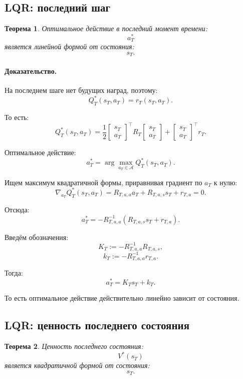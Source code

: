 \documentclass[12pt,a4paper]{article}
\newtheorem{theorem}{Теорема}
\begin{document}
\subsection{LQR: последний шаг}

\begin{theorem}
Оптимальное действие в последний момент времени:
\[
a_T^\ast
\]
является линейной формой от состояния:
\[
s_T.
\]
\end{theorem}

\paragraph{Доказательство.}

На последнем шаге нет будущих наград, поэтому:
\[
Q_T^\ast(s_T,a_T)
=
r_T(s_T,a_T).
\]

То есть:
\[
Q_T^\ast(s_T,a_T)
=
\frac{1}{2}
\begin{bmatrix}
s_T\\
a_T
\end{bmatrix}^{\top}
R_T
\begin{bmatrix}
s_T\\
a_T
\end{bmatrix}
+
\begin{bmatrix}
s_T\\
a_T
\end{bmatrix}^{\top}
r_T.
\]

Оптимальное действие:
\[
a_T^\ast
=
\arg\max_{a_T\in\mathcal A}
Q_T^\ast(s_T,a_T).
\]

Ищем максимум квадратичной формы, приравнивая градиент по $a_T$ к нулю:
\[
\nabla_{a_T}Q_T^\ast(s_T,a_T)
=
R_{T,a,a}a_T
+
R_{T,a,s}s_T
+
r_{T,a}
=
0.
\]

Отсюда:
\[
a_T^\ast
=
-
R_{T,a,a}^{-1}
\left(
R_{T,a,s}s_T+r_{T,a}
\right).
\]

Введём обозначения:
\[
K_T
:=
-
R_{T,a,a}^{-1}R_{T,a,s},
\]
\[
k_T
:=
-
R_{T,a,a}^{-1}r_{T,a}.
\]

Тогда:
\[
a_T^\ast
=
K_Ts_T+k_T.
\]

То есть оптимальное действие действительно линейно зависит от состояния.

\subsection{LQR: ценность последнего состояния}

\begin{theorem}
Ценность последнего состояния:
\[
V^\ast(s_T)
\]
является квадратичной формой от состояния:
\[
s_T.
\]
\end{theorem}
\end{document}
